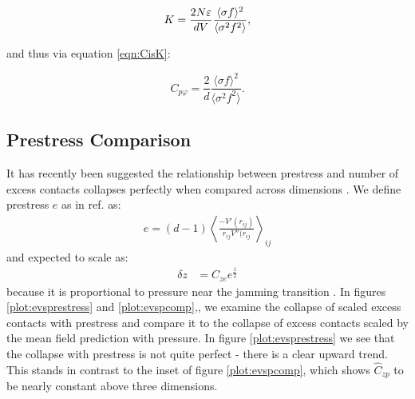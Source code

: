 \begin{equation}
K = \frac{2 N \varepsilon}{ d V}  \frac{\langle \sigma f \rangle^2}{\langle \sigma^2 f^2 \rangle},
\end{equation}

and thus via equation \ref{eqn:CisK}:

\begin{equation}
    C_{p\varphi} = \frac{2}{d} \frac{ \langle \sigma f \rangle^2}{\langle \sigma^2 f^2 \rangle}.\label{eqn:seanPredictionSupp}
\end{equation}

\subsection{Prestress Comparison}

It has recently been suggested the relationship between prestress and number of excess contacts collapses perfectly when compared across dimensions \cite{shimada_low-frequency_2019}. We define prestress $e$ as in ref. \cite{shimada_low-frequency_2019} as:
%
\begin{align}
 e = \left(d-1\right) \left\langle \frac{-V'(r_{ij})}{r_{ij}V''(r_{ij}} \right\rangle_{ij}
\end{align}
%
and expected to scale as:
%
\begin{align}
 \delta z &= C_{ze} e^\frac{1}{2} \label{sup_eqn:evsprestress}
\end{align}
%
because it is proportional to pressure near the jamming transition \cite{shimada_low-frequency_2019}. In figures \ref{plot:evsprestress} and  \ref{plot:evspcomp},, we examine the collapse of scaled excess contacts with prestress and compare it to the collapse of excess contacts scaled by the mean field prediction with pressure. In figure \ref{plot:evsprestress} we see that the collapse with prestress is not quite perfect - there is a clear upward trend. This stands in contrast to the inset of figure \ref{plot:evspcomp}, which shows $\hat{C}_{zp}$ to be nearly constant above three dimensions.


